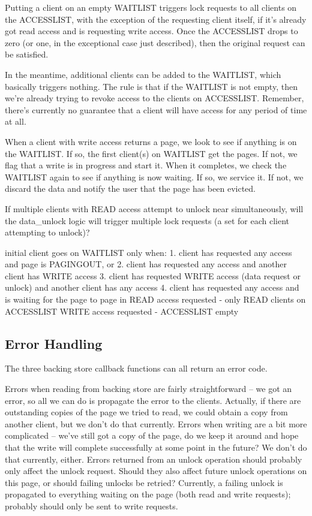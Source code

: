 \documentclass{article}
\begin{document}
Putting a client on an empty WAITLIST triggers lock requests to all
clients on the ACCESSLIST, with the exception of the requesting client
itself, if it's already got read access and is requesting write
access.  Once the ACCESSLIST drops to zero (or one, in the exceptional
case just described), then the original request can be satisfied.

In the meantime, additional clients can be added to the WAITLIST,
which basically triggers nothing.  The rule is that if the WAITLIST is
not empty, then we're already trying to revoke access to the clients
on ACCESSLIST.  Remember, there's currently no guarantee that a client
will have access for any period of time at all.

When a client with write access returns a page, we look to see if
anything is on the WAITLIST.  If so, the first client(s) on WAITLIST
get the pages.  If not, we flag that a write is in progress and start
it.  When it completes, we check the WAITLIST again to see if anything
is now waiting.  If so, we service it.  If not, we discard the data
and notify the user that the page has been evicted.

If multiple clients with READ access attempt to unlock near
simultaneously, will the data_unlock logic will trigger multiple lock
requests (a set for each client attempting to unlock)?

initial client goes on WAITLIST only when:
1. client has requested any access and page is PAGINGOUT, or
2. client has requested any access and another client has WRITE access
3. client has requested WRITE access (data request or unlock) and another client has any access
4. client has requested any access and is waiting for the page to page in
     READ access requested - only READ clients on ACCESSLIST
     WRITE access requested - ACCESSLIST empty


\subsection{Error Handling}

The three backing store callback functions can all return an error
code.

Errors when reading from backing store are fairly straightforward --
we got an error, so all we can do is propagate the error to the
clients.  Actually, if there are outstanding copies of the page we
tried to read, we could obtain a copy from another client, but we
don't do that currently.  Errors when writing are a bit more
complicated -- we've still got a copy of the page, do we keep it
around and hope that the write will complete successfully at some
point in the future?  We don't do that currently, either.  Errors
returned from an unlock operation should probably only affect the
unlock request.  Should they also affect future unlock operations on
this page, or should failing unlocks be retried?  Currently, a failing
unlock is propagated to everything waiting on the page (both read and
write requests); probably should only be sent to write requests.
\end{document}
